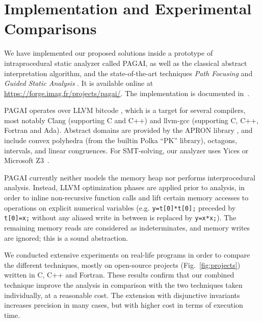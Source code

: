 \section{Implementation and Experimental Comparisons}
\label{sec:experiments}

We have implemented our proposed solutions inside a prototype of intraprocedural
static analyzer called PAGAI,
as well as the classical abstract interpretation algorithm, and the state-of-the-art
techniques \emph{Path Focusing} \cite{Monniaux_Gonnord_SAS11} and \emph{Guided
Static Analysis} \cite{DBLP:conf/sas/GopanR07}. It is
available online at \url{https://forge.imag.fr/projects/pagai/}. The
implementation is documented in~\cite{julien-henry-m2r}.

PAGAI operates over LLVM bitcode \cite{LLVM_langref,Lattner:2004:LCF:977395.977673}, which is a target for several compilers, most notably Clang (supporting C and C++) and llvm-gcc (supporting C, C++, Fortran and Ada).
Abstract domains are provided by the APRON library \cite{DBLP:conf/cav/JeannetM09}, and include convex polyhedra (from the builtin Polka ``PK'' library), octagons, intervals, and linear congruences.
For SMT-solving, our analyzer uses Yices
\cite{DBLP:conf/cav/DutertreM06} or Microsoft Z3~\cite{DBLP:conf/tacas/MouraB08}.

PAGAI currently neither models the memory heap nor performs interprocedural analysis. Instead, LLVM optimization phases are applied prior to analysis, in order to inline non-recursive function calls and lift certain memory accesses to operations on explicit numerical variables
(e.g. \lstinline|y=t[0]*t[0];| preceded by \lstinline|t[0]=x;| without any aliased write in between is replaced by \lstinline|y=x*x;|).
The remaining memory reads are considered as indeterminates, and memory writes are ignored; this is a sound abstraction.

We conducted extensive experiments on real-life programs in order to compare the
different techniques, mostly on open-source projects (Fig.~\ref{fig:projects}) written in C, C++ and Fortran.
These results confirm that our combined technique improve the
analysis in comparison with the two techniques taken individually, at
a reasonable cost. The extension with disjunctive invariants increases
precision in many cases, but with higher cost in terms of execution
time.

